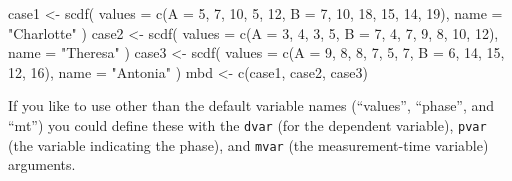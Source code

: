 \documentclass[
  letterpaper,
  DIV=11,
  numbers=noendperiod]{scrreprt}
\newenvironment{Shaded}{\begin{snugshade}}{\end{snugshade}}
\newcommand{\AttributeTok}[1]{\textcolor[rgb]{0.40,0.45,0.13}{#1}}
\newcommand{\DecValTok}[1]{\textcolor[rgb]{0.68,0.00,0.00}{#1}}
\newcommand{\FunctionTok}[1]{\textcolor[rgb]{0.28,0.35,0.67}{#1}}
\newcommand{\NormalTok}[1]{\textcolor[rgb]{0.00,0.23,0.31}{#1}}
\newcommand{\OtherTok}[1]{\textcolor[rgb]{0.00,0.23,0.31}{#1}}
\newcommand{\StringTok}[1]{\textcolor[rgb]{0.13,0.47,0.30}{#1}}
\begin{document}
\begin{Shaded}
\begin{Highlighting}[]
\NormalTok{case1 }\OtherTok{\textless{}{-}} \FunctionTok{scdf}\NormalTok{(}
  \AttributeTok{values =} \FunctionTok{c}\NormalTok{(}\AttributeTok{A =} \DecValTok{5}\NormalTok{, }\DecValTok{7}\NormalTok{, }\DecValTok{10}\NormalTok{, }\DecValTok{5}\NormalTok{, }\DecValTok{12}\NormalTok{, }\AttributeTok{B =} \DecValTok{7}\NormalTok{, }\DecValTok{10}\NormalTok{, }\DecValTok{18}\NormalTok{, }\DecValTok{15}\NormalTok{, }\DecValTok{14}\NormalTok{, }\DecValTok{19}\NormalTok{), }
  \AttributeTok{name =} \StringTok{"Charlotte"}
\NormalTok{)}
\NormalTok{case2 }\OtherTok{\textless{}{-}} \FunctionTok{scdf}\NormalTok{(}
  \AttributeTok{values =} \FunctionTok{c}\NormalTok{(}\AttributeTok{A =} \DecValTok{3}\NormalTok{, }\DecValTok{4}\NormalTok{, }\DecValTok{3}\NormalTok{, }\DecValTok{5}\NormalTok{, }\AttributeTok{B =} \DecValTok{7}\NormalTok{, }\DecValTok{4}\NormalTok{, }\DecValTok{7}\NormalTok{, }\DecValTok{9}\NormalTok{, }\DecValTok{8}\NormalTok{, }\DecValTok{10}\NormalTok{, }\DecValTok{12}\NormalTok{), }
  \AttributeTok{name =} \StringTok{"Theresa"}
\NormalTok{)}
\NormalTok{case3 }\OtherTok{\textless{}{-}} \FunctionTok{scdf}\NormalTok{(}
  \AttributeTok{values =} \FunctionTok{c}\NormalTok{(}\AttributeTok{A =} \DecValTok{9}\NormalTok{, }\DecValTok{8}\NormalTok{, }\DecValTok{8}\NormalTok{, }\DecValTok{7}\NormalTok{, }\DecValTok{5}\NormalTok{, }\DecValTok{7}\NormalTok{, }\AttributeTok{B =} \DecValTok{6}\NormalTok{, }\DecValTok{14}\NormalTok{, }\DecValTok{15}\NormalTok{, }\DecValTok{12}\NormalTok{, }\DecValTok{16}\NormalTok{), }
  \AttributeTok{name =} \StringTok{"Antonia"}
\NormalTok{)}
\NormalTok{mbd }\OtherTok{\textless{}{-}} \FunctionTok{c}\NormalTok{(case1, case2, case3)}
\end{Highlighting}
\end{Shaded}

If you like to use other than the default variable names (``values'',
``phase'', and ``mt'') you could define these with the \texttt{dvar}
(for the dependent variable), \texttt{pvar} (the variable indicating the
phase), and \texttt{mvar} (the measurement-time variable) arguments.
\end{document}
